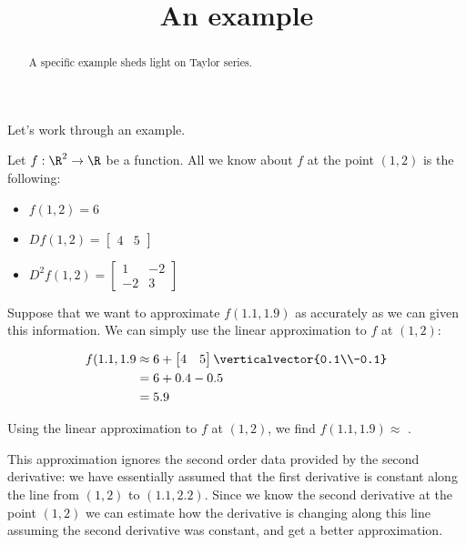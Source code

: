 \documentclass{ximera}
\title{An example}
\begin{document}
\begin{abstract}
  A specific example sheds light on Taylor series.
\end{abstract}\maketitle

Let's work through an example.

\begin{question}
  Let $f:\R^2 \to \R$ be a function.  All we know about $f$ at the point $(1,2)$ is the following:
  \begin{itemize}
  \item $f(1,2) = 6$
  \item \(Df(1,2) = \begin{bmatrix} 4 & 5 \end{bmatrix}\)
  \item \( D^2f(1,2)  = \begin{bmatrix} 1 & -2 \\ -2 & 3\end{bmatrix}\)
  \end{itemize} 
  
  Suppose that we want to approximate $f(1.1,1.9)$ as accurately as we can given this information.
  We can simply use the linear approximation to $f$ at $(1,2)$:
  
  \begin{solution}
    \begin{hint}
      \begin{align*}
        f(1.1,1.9 &\approx 6+\begin{bmatrix} 4 & 5 \end{bmatrix} \verticalvector{0.1\\-0.1}\\
        &=6+0.4-0.5\\
        &=5.9
      \end{align*}
    \end{hint}
    Using the linear approximation to $f$ at $(1,2)$, we find $f(1.1,1.9) \approx$ .
  \end{solution}
  
  This approximation ignores the second order data provided by the second derivative: we have essentially 
  assumed that the first derivative is constant along the line from $(1,2)$ to $(1.1,2.2)$.  Since we know the second 
  derivative at the point $(1,2)$ we can estimate how the derivative is changing along this line assuming the second 
  derivative was constant, and get a better approximation.
  

\end{question}
\end{document}

